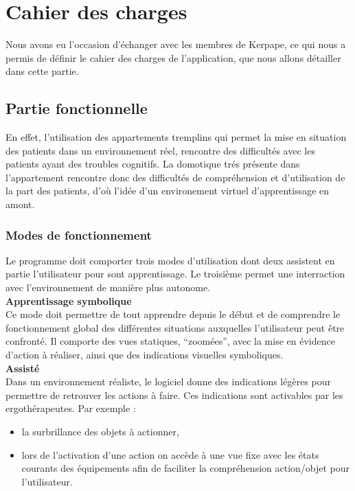 \section{Cahier des charges}

Nous avons eu l'occasion d'échanger avec les membres de Kerpape, ce qui nous a permis de définir le cahier des charges de l'application, que nous allons détailler dans cette partie.

\subsection{Partie fonctionnelle}

En effet, l'utilisation des appartements tremplins qui permet la mise en situation des patients dans un environnement réel, rencontre des difficultés avec les patients ayant des troubles cognitifs. La domotique trés présente dans l'appartement rencontre donc des difficultés de compréhension et d'utilisation de la part des patients, d'où l'idée d'un environement virtuel d'apprentissage en amont.

\subsubsection{Modes de fonctionnement}

Le programme doit comporter trois modes d'utilisation dont deux assistent en partie l'utilisateur pour sont apprentissage. Le troisième permet une interraction avec l'environnement de manière plus autonome.\\

\textbf{Apprentissage symbolique}
\\

Ce mode doit permettre de tout apprendre depuis le début et de comprendre le fonctionnement global des différentes situations auxquelles l'utilisateur peut être confronté. Il comporte des vues statiques, \enquote{zoomées}, avec la mise en évidence d'action à réaliser, ainsi que des indications visuelles symboliques.\\

\textbf{Assisté}
\\

Dans un environnement réaliste, le logiciel donne des indications légères pour permettre de retrouver les actions à faire. Ces indications sont activables par les ergothérapeutes. Par exemple :
\begin{itemize}
  \item la surbrillance des objets à actionner,
  \item lors de l'activation d'une action on accède à une vue fixe avec les états courants des équipements afin de faciliter la compréhension action/objet pour l'utilisateur. \\
\end{itemize}

